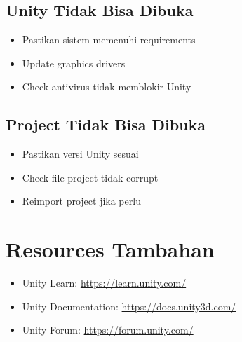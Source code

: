 \subsection{Unity Tidak Bisa Dibuka}

\begin{itemize}
\item Pastikan sistem memenuhi requirements
\item Update graphics drivers
\item Check antivirus tidak memblokir Unity
\end{itemize}

\subsection{Project Tidak Bisa Dibuka}

\begin{itemize}
\item Pastikan versi Unity sesuai
\item Check file project tidak corrupt
\item Reimport project jika perlu
\end{itemize}

\section{Resources Tambahan}

\begin{itemize}
\item Unity Learn: \url{https://learn.unity.com/}
\item Unity Documentation: \url{https://docs.unity3d.com/}
\item Unity Forum: \url{https://forum.unity.com/}
\end{itemize}
